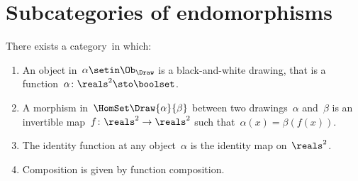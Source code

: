 
\section{Subcategories of endomorphisms}
\label{sec:Draw}

\index{\Draw}
\begin{definition}[Drawings]
    \label{def:Draw}
    There exists a category~\Draw in which:
    \begin{enumerate}
        \item An object in~$\alpha\setin \Ob_\Draw$ is a black-and-white drawing,
              that is a function~$\alpha \colon \reals^2 \sto \boolset$.
        \item A morphism in~$\HomSet\Draw{\alpha}{\beta}$ between two drawings~$\alpha$ and~$\beta$ is an invertible map~$f\colon \reals^2 \to \reals^2$ such that~$\alpha(x) = \beta(f(x))$.
        \item The identity function at any object~$\alpha$ is the identity map on~$\reals^2$.
        \item Composition is given by function composition.
    \end{enumerate}
\end{definition}

